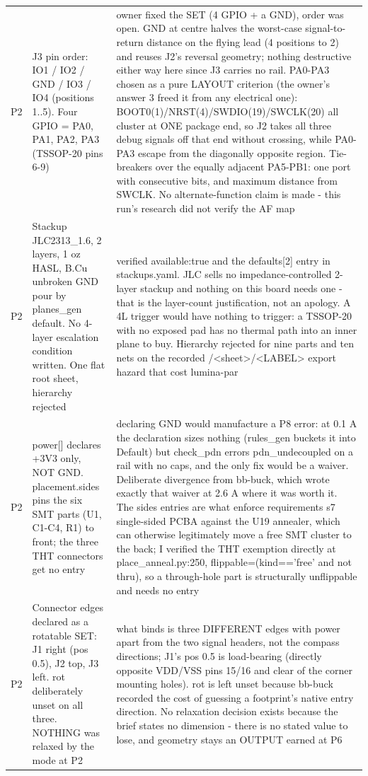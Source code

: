 \documentclass[11pt,a4paper]{article}
\begin{document}
{\begin{longtable}{lp{5.2cm}p{7.2cm}}
P2 & J3 pin order: IO1 / IO2 / GND / IO3 / IO4 (positions 1..5). Four GPIO = PA0, PA1, PA2, PA3 (TSSOP-20 pins 6-9) & owner fixed the SET (4 GPIO + a GND), order was open. GND at centre halves the worst-case signal-to-return distance on the flying lead (4 positions to 2) and reuses J2's reversal geometry; nothing destructive either way here since J3 carries no rail. PA0-PA3 chosen as a pure LAYOUT criterion (the owner's answer 3 freed it from any electrical one): BOOT0(1)/NRST(4)/SWDIO(19)/SWCLK(20) all cluster at ONE package end, so J2 takes all three debug signals off that end without crossing, while PA0-PA3 escape from the diagonally opposite region. Tie-breakers over the equally adjacent PA5-PB1: one port with consecutive bits, and maximum distance from SWCLK. No alternate-function claim is made - this run's research did not verify the AF map \\
P2 & Stackup JLC2313\_1.6, 2 layers, 1 oz HASL, B.Cu unbroken GND pour by planes\_gen default. No 4-layer escalation condition written. One flat root sheet, hierarchy rejected & verified available:true and the defaults{[}2{]} entry in stackups.yaml. JLC sells no impedance-controlled 2-layer stackup and nothing on this board needs one - that is the layer-count justification, not an apology. A 4L trigger would have nothing to trigger: a TSSOP-20 with no exposed pad has no thermal path into an inner plane to buy. Hierarchy rejected for nine parts and ten nets on the recorded /\textless{}sheet\textgreater{}/\textless{}LABEL\textgreater{} export hazard that cost lumina-par \\
P2 & power{[}{]} declares +3V3 only, NOT GND. placement.sides pins the six SMT parts (U1, C1-C4, R1) to front; the three THT connectors get no entry & declaring GND would manufacture a P8 error: at 0.1 A the declaration sizes nothing (rules\_gen buckets it into Default) but check\_pdn errors pdn\_undecoupled on a rail with no caps, and the only fix would be a waiver. Deliberate divergence from bb-buck, which wrote exactly that waiver at 2.6 A where it was worth it. The sides entries are what enforce requirements s7 single-sided PCBA against the U19 annealer, which can otherwise legitimately move a free SMT cluster to the back; I verified the THT exemption directly at place\_anneal.py:250, flippable=(kind=='free' and not thru), so a through-hole part is structurally unflippable and needs no entry \\
P2 & Connector edges declared as a rotatable SET: J1 right (pos 0.5), J2 top, J3 left. rot deliberately unset on all three. NOTHING was relaxed by the mode at P2 & what binds is three DIFFERENT edges with power apart from the two signal headers, not the compass directions; J1's pos 0.5 is load-bearing (directly opposite VDD/VSS pins 15/16 and clear of the corner mounting holes). rot is left unset because bb-buck recorded the cost of guessing a footprint's native entry direction. No relaxation decision exists because the brief states no dimension - there is no stated value to lose, and geometry stays an OUTPUT earned at P6 \\

\end{longtable}}
\end{document}
